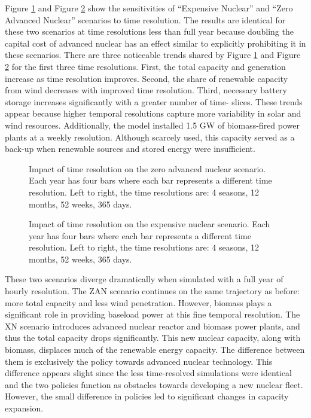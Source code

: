 Figure \ref{fig:time_res_ZAN} and Figure \ref{fig:time_res_XN} show the sensitivities of
``Expensive Nuclear'' and ``Zero Advanced Nuclear'' scenarios to time resolution.
The results are identical for these two scenarios at time resolutions less than
full year because doubling the capital cost of advanced nuclear has an effect similar
to explicitly prohibiting it in these scenarios.
There are three noticeable trends shared by Figure \ref{fig:time_res_ZAN} and Figure
\ref{fig:time_res_XN} for the first three time resolutions.
 First, the total capacity and generation increase as time resolution improves.
Second, the share of renewable capacity from wind decreases with improved time resolution.
Third, necessary battery storage increases significantly with a greater number of time-
slices. These trends appear because higher temporal resolutions capture more
variability in solar and wind resources. Additionally, the model installed 1.5 GW
of biomass-fired power plants at a weekly resolution. Although scarcely used,
this capacity served as a back-up when renewable sources and stored energy were
insufficient.

\begin{figure}[H]
  \centering
  \resizebox{0.95\columnwidth}{!}{}
  \caption{Impact of time resolution on the zero advanced nuclear scenario.
  Each year has four bars where each bar represents a different time resolution.
  Left to right, the time resolutions are: 4 seasons, 12 months, 52 weeks, 365 days.}
  \label{fig:time_res_ZAN}
\end{figure}
\begin{figure}[H]
  \centering
  \resizebox{0.95\columnwidth}{!}{}
  \caption{Impact of time resolution on the expensive nuclear scenario.
  Each year has four bars where each bar represents a different time resolution.
  Left to right, the time resolutions are: 4 seasons, 12 months, 52 weeks, 365 days.}
  \label{fig:time_res_XN}
\end{figure}

These two scenarios diverge dramatically when simulated with a full year of hourly
resolution. The ZAN scenario continues on the same trajectory as before: more total capacity
and less wind penetration. However, biomass plays
a significant role in providing baseload power at this fine temporal resolution.
The XN scenario introduces advanced nuclear reactor and biomass power plants, and
thus the total capacity drops significantly.  This new nuclear capacity, along
with biomass, displaces much of the
renewable energy capacity. The difference between them is exclusively the policy
towards advanced nuclear technology. This difference appears slight since the less
time-resolved simulations were identical and the two policies function as obstacles
towards developing a new nuclear fleet. However, the small difference in policies
led to significant changes in capacity expansion.

